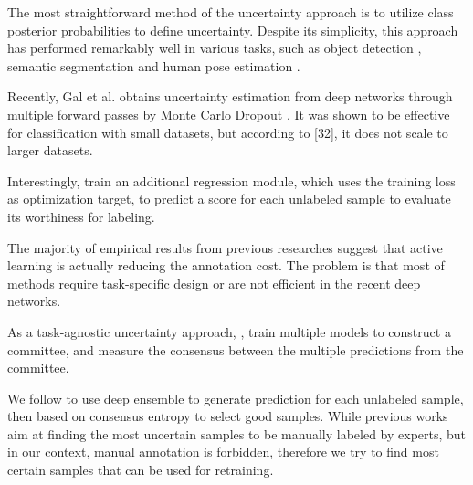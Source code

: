 The most straightforward method of the uncertainty approach is to utilize class posterior probabilities to define uncertainty. Despite its simplicity, this approach has performed remarkably well in various tasks, such as object detection \cite{wang2018towardshuman}, semantic segmentation \cite{jain2016activesegmentationprop} and human pose estimation \cite{liu2017activehumanpose}.

Recently, Gal et al. \cite{gal2017deep} obtains uncertainty estimation from deep networks through multiple forward passes by Monte Carlo Dropout \cite{gal2016dropout}. It was shown to be effective for classification with small datasets, but according to [32], it does not scale to larger datasets.

Interestingly, \cite{yoo2019learningloss} train an additional regression module, which uses the training loss as optimization target, to predict a score for each unlabeled sample to evaluate its worthiness for labeling. 

The majority of empirical results from previous researches suggest that active learning is actually reducing the annotation cost. The problem is that most of methods require task-specific design or are not efficient in the recent deep networks.

As a task-agnostic uncertainty approach, \cite{seung1992query}, \cite{beluch2018power} train multiple models to construct a committee, and measure the consensus between the multiple predictions from the committee.

We follow \cite{beluch2018power} to use deep ensemble to generate prediction for each unlabeled sample, then based on consensus entropy to select good samples. While previous works aim at finding the most uncertain samples to be manually labeled by experts, but in our context, manual annotation is forbidden, therefore we try to find most certain samples that can be used for retraining.
